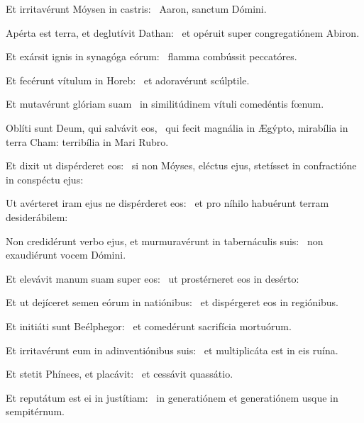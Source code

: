 
\item Et irritavérunt Móysen in castris:~\psstar{} Aaron, sanctum Dómini.

\item Apérta est terra, et deglutívit Dathan:~\psstar{} et opéruit super congregatiónem Abiron.

\item Et exársit ignis in synagóga eórum:~\psstar{} flamma combússit peccatóres.

\item Et fecérunt vítulum in Horeb:~\psstar{} et adoravérunt scúlptile.

\item Et mutavérunt glóriam suam~\psstar{} in similitúdinem vítuli comedéntis fœnum.

\item Oblíti sunt Deum, qui salvávit eos,~\psstar{} qui fecit magnália in Ægýpto, mirabília in terra Cham: terribília in Mari Rubro.

\item Et dixit ut dispérderet eos:~\psstar{} si non Móyses, eléctus ejus, stetísset in confractióne in conspéctu ejus:

\item Ut avérteret iram ejus ne dispérderet eos:~\psstar{} et pro níhilo habuérunt terram desiderábilem:

\item Non credidérunt verbo ejus, et murmuravérunt in tabernáculis suis:~\psstar{} non exaudiérunt vocem Dómini.

\item Et elevávit manum suam super eos:~\psstar{} ut prostérneret eos in desérto:

\item Et ut dejíceret semen eórum in natiónibus:~\psstar{} et dispérgeret eos in regiónibus.

\item Et initiáti sunt Beélphegor:~\psstar{} et comedérunt sacrifícia mortuórum.

\item Et irritavérunt eum in adinventiónibus suis:~\psstar{} et multiplicáta est in eis ruína.

\item Et stetit Phínees, et placávit:~\psstar{} et cessávit quassátio.

\item Et reputátum est ei in justítiam:~\psstar{} in generatiónem et generatiónem usque in sempitérnum.
